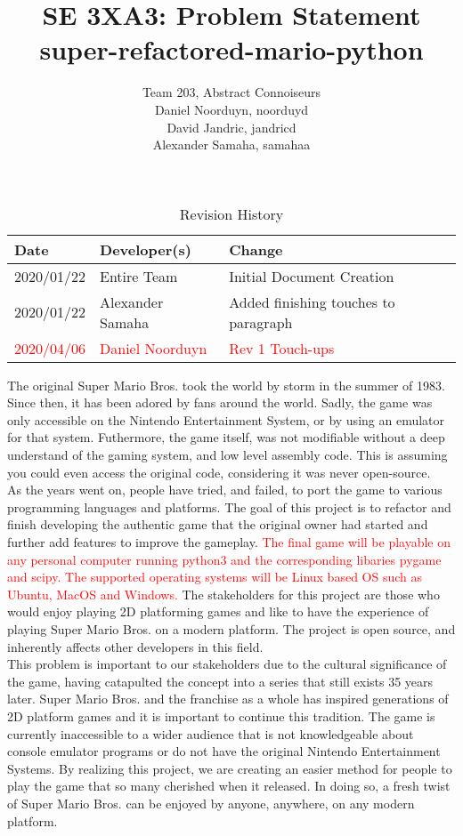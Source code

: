 \documentclass{article}
\title{SE 3XA3: Problem Statement\\super-refactored-mario-python}
\author{Team 203, Abstract Connoiseurs
		\\ Daniel Noorduyn, noorduyd
		\\ David Jandric, jandricd
		\\ Alexander Samaha, samahaa
}
\date{}
\begin{document}
\begin{table}[hp]
\caption{Revision History} \label{TblRevisionHistory}
\begin{tabularx}{\textwidth}{llX}
\toprule
\textbf{Date} & \textbf{Developer(s)} & \textbf{Change}\\
\midrule
2020/01/22 & Entire Team & Initial Document Creation\\
2020/01/22 & Alexander Samaha & Added finishing touches to paragraph\\
\textcolor{red}{2020/04/06} & \textcolor{red}{Daniel Noorduyn} & \textcolor{red}{Rev 1 Touch-ups}\\
\bottomrule
\end{tabularx}
\end{table}

\newpage

\maketitle

The original Super Mario Bros. took the world by storm in the summer of 1983.
Since then, it has been adored by fans around the world. Sadly, the game was
only accessible on the Nintendo Entertainment System, or by using an emulator
for that system. Futhermore, the game itself, was not modifiable without a deep
understand of the gaming system, and low level assembly code. This is assuming
you could even access the original code, considering it was never open-source.\\

As the years went on, people have tried, and failed, to port the game to various
programming languages and platforms. The goal of this project is to refactor and
finish developing the authentic game that the original owner had started and
further add features to improve the gameplay. \textcolor{red}{The final game
will be playable on any personal computer running python3 and the corresponding
libaries pygame and scipy. The supported operating systems will be Linux based
OS such as Ubuntu, MacOS and Windows.} The stakeholders for this project are
those who would enjoy playing 2D platforming games and like to have the
experience of playing Super Mario Bros. on a modern platform. The project is
open source, and inherently affects other developers in this field. \\

This problem is important to our stakeholders due to the cultural significance
of the game, having catapulted the concept into a series that still exists 35
years later. Super Mario Bros. and the franchise as a whole has inspired
generations of 2D platform games and it is important to continue this tradition.
The game is currently inaccessible to a wider audience that is not knowledgeable
about console emulator programs or do not have the original Nintendo
Entertainment Systems. By realizing this project, we are creating an easier
method for people to play the game that so many cherished when it released. In
doing so, a fresh twist of Super Mario Bros. can be enjoyed by anyone, anywhere,
on any modern platform.





\end{document}
